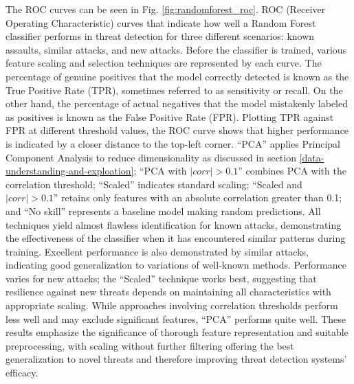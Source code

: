 \documentclass[journal]{IEEEtran}
\begin{document}
The ROC curves can be seen in Fig. \ref{fig:randomforest_roc}. ROC (Receiver Operating Characteristic) curves that indicate how well a Random Forest classifier performs in threat detection for three different scenarios: known assaults, similar attacks, and new attacks. Before the classifier is trained, various feature scaling and selection techniques are represented by each curve. The percentage of genuine positives that the model correctly detected is known as the True Positive Rate (TPR), sometimes referred to as sensitivity or recall. On the other hand, the percentage of actual negatives that the model mistakenly labeled as positives is known as the False Positive Rate (FPR). Plotting TPR against FPR at different threshold values, the ROC curve shows that higher performance is indicated by a closer distance to the top-left corner. ``PCA'' applies Principal Component Analysis to reduce dimensionality as discussed in section \ref{data-understanding-and-exploation}; ``PCA with $|corr|> 0.1$'' combines PCA with the correlation threshold; ``Scaled'' indicates standard scaling; ``Scaled and $|corr| > 0.1$'' retains only features with an absolute correlation greater than 0.1; and ``No skill'' represents a baseline model making random predictions. All techniques yield almost flawless identification for known attacks, demonstrating the effectiveness of the classifier when it has encountered similar patterns during training. Excellent performance is also demonstrated by similar attacks, indicating good generalization to variations of well-known methods. Performance varies for new attacks; the ``Scaled'' technique works best, suggesting that resilience against new threats depends on maintaining all characteristics with appropriate scaling. While approaches involving correlation thresholds perform less well and may exclude significant features, ``PCA'' performs quite well. These results emphasize the significance of thorough feature representation and suitable preprocessing, with scaling without further filtering offering the best generalization to novel threats and therefore improving threat detection systems' efficacy.
\end{document}
